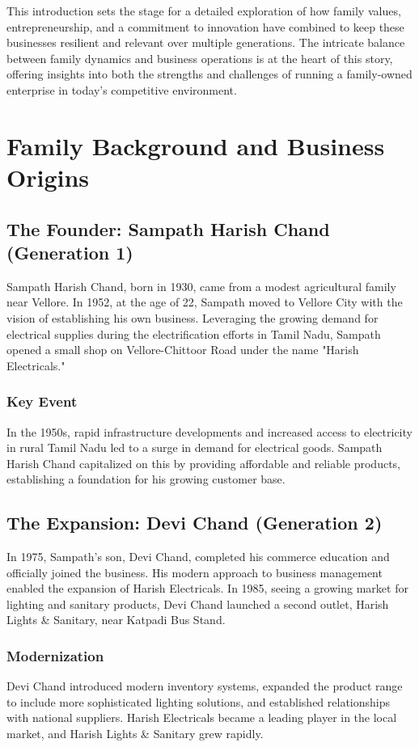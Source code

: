 \documentclass[a4paper,12pt]{report}
\begin{document}
This introduction sets the stage for a detailed exploration of how family values, entrepreneurship, and a commitment to innovation have combined to keep these businesses resilient and relevant over multiple generations. The intricate balance between family dynamics and business operations is at the heart of this story, offering insights into both the strengths and challenges of running a family-owned enterprise in today’s competitive environment.





\chapter{Family Background and Business Origins}

\section{The Founder: Sampath Harish Chand (Generation 1)}
Sampath Harish Chand, born in 1930, came from a modest agricultural family near Vellore. In 1952, at the age of 22, Sampath moved to Vellore City with the vision of establishing his own business. Leveraging the growing demand for electrical supplies during the electrification efforts in Tamil Nadu, Sampath opened a small shop on Vellore-Chittoor Road under the name "Harish Electricals."

\subsection{Key Event}
In the 1950s, rapid infrastructure developments and increased access to electricity in rural Tamil Nadu led to a surge in demand for electrical goods. Sampath Harish Chand capitalized on this by providing affordable and reliable products, establishing a foundation for his growing customer base.

\section{The Expansion: Devi Chand (Generation 2)}
In 1975, Sampath's son, Devi Chand, completed his commerce education and officially joined the business. His modern approach to business management enabled the expansion of Harish Electricals. In 1985, seeing a growing market for lighting and sanitary products, Devi Chand launched a second outlet, Harish Lights \& Sanitary, near Katpadi Bus Stand.

\subsection{Modernization}
Devi Chand introduced modern inventory systems, expanded the product range to include more sophisticated lighting solutions, and established relationships with national suppliers. Harish Electricals became a leading player in the local market, and Harish Lights \& Sanitary grew rapidly.
\end{document}
